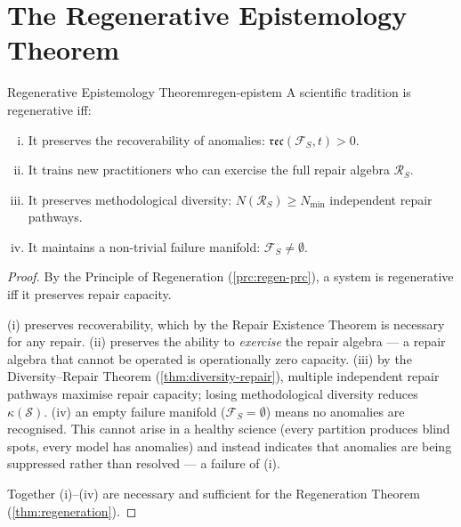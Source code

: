\documentclass[12pt,twoside,openright]{book}
\newcommand{\reco}{\mathfrak{rec}}
\newcounter{exercise}[chapter]
\begin{document}
\section{The Regenerative Epistemology Theorem}

\begin{theorem}{Regenerative Epistemology Theorem}{regen-epistem}
  A scientific tradition is regenerative iff:
  \begin{enumerate}[(i)]
    \item It preserves the recoverability of anomalies:
          $\reco(\mathcal{F}_S, t) > 0$.
    \item It trains new practitioners who can exercise
          the full repair algebra $\mathcal{R}_S$.
    \item It preserves methodological diversity:
          $N(\mathcal{R}_S) \ge N_{\min}$ independent
          repair pathways.
    \item It maintains a non-trivial failure manifold:
          $\mathcal{F}_S \ne \emptyset$.
  \end{enumerate}
\end{theorem}

\begin{proof}
  By the Principle of Regeneration
  (\cref{prc:regen-prc}), a system is regenerative
  iff it preserves repair capacity.

  (i) preserves recoverability, which by the Repair
  Existence Theorem is necessary for any repair.
  (ii) preserves the ability to \emph{exercise} the
  repair algebra — a repair algebra that cannot be
  operated is operationally zero capacity.
  (iii) by the Diversity--Repair Theorem
  (\cref{thm:diversity-repair}), multiple independent
  repair pathways maximise repair capacity; losing
  methodological diversity reduces $\kappa(\mathcal{S})$.
  (iv) an empty failure manifold ($\mathcal{F}_S = \emptyset$)
  means no anomalies are recognised. This cannot arise
  in a healthy science (every partition produces blind
  spots, every model has anomalies) and instead
  indicates that anomalies are being suppressed rather
  than resolved — a failure of (i).

  Together (i)--(iv) are necessary and sufficient for
  the Regeneration Theorem (\cref{thm:regeneration}).
\end{proof}
\end{document}
